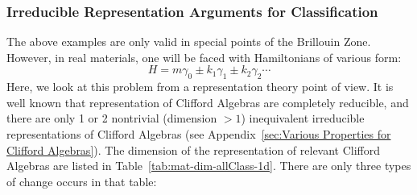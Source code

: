 \subsubsection{Irreducible Representation Arguments for Classification}
\label{sec:Irreducible Representation Arguments for Classification}
The above examples are only valid in special points of the Brillouin Zone.
However, in real materials, one will be faced with Hamiltonians of various form:
\begin{equation}
    H = m\gamma_0 \pm k_1\gamma_1 \pm k_2\gamma_2 \cdots
\end{equation}
Here, we look at this problem from a representation theory point of view. It is
well known that representation of Clifford Algebras are completely reducible,
and there are only 1 or 2 nontrivial (dimension $>1$) inequivalent irreducible
representations of Clifford Algebras (see Appendix~\ref{sec:Various Properties for
Clifford Algebras}).  The dimension of the representation of relevant Clifford
Algebras are listed in Table~\ref{tab:mat-dim-allClass-1d}. There are only three
types of change occurs in that table:

